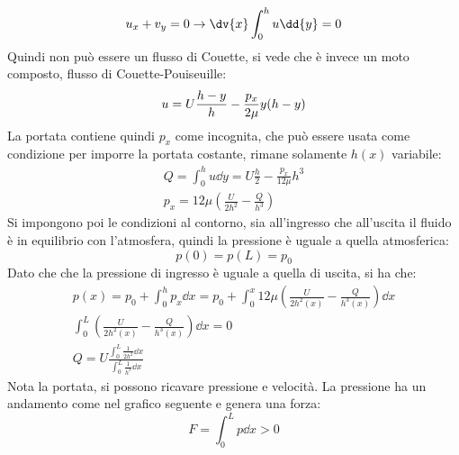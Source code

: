 %
	\begin{equation*}
		u_x + v_y = 0 \rightarrow \dv{x} \int_0^h u \dd{y} = 0
	\end{equation*}
%
Quindi non può essere un flusso di Couette, si vede che è invece un moto composto, flusso di Couette-Pouiseuille:
%
	\begin{equation*}
		u = U \frac{h - y}{h} - \frac{p_x}{2 \mu} y (h - y)\\
	\end{equation*}
%
La portata contiene quindi $p_x$ come incognita, che può essere usata come condizione per imporre la portata costante, rimane solamente $h(x)$ variabile:
%
	\begin{equation*}
		\begin{gathered}
			Q = \int_0^h u \dd{y} = U \frac{h}{2} - \frac{p_x}{12 \mu} h^3\\
			p_x = 12 \mu \left( \frac{U}{2 h^2} - \frac{Q}{h^3} \right)
		\end{gathered}
	\end{equation*}
%
Si impongono poi le condizioni al contorno, sia all'ingresso che all'uscita il fluido è in equilibrio con l'atmosfera, quindi la pressione è uguale a quella atmosferica:
%
	\begin{equation*}
		p(0) = p(L) = p_0
	\end{equation*}
%
Dato che che la pressione di ingresso è uguale a quella di uscita, si ha che:
%
	\begin{equation*}
		\begin{gathered}
			p(x) = p_0 + \int_0^h p_x \dd{x} = p_0 + \int_0^x 12 \mu \left( \frac{U}{2 h^2(x)} - \frac{Q}{h^3(x)} \right) \dd{x}\\
			\int_0^L \left( \frac{U}{2 h^2(x)} - \frac{Q}{h^3(x)} \right) \dd{x} = 0\\
			Q = U \frac{\int_0^L \frac{1}{2 h^2} \dd{x} }{\int_0^L \frac{1}{h^3} \dd{x}}
		\end{gathered}
	\end{equation*}
%
Nota la portata, si possono ricavare pressione e velocità.
La pressione ha un andamento come nel grafico seguente e genera una forza:
%
	\begin{equation*}
		F = \int_0^L p \dd{x} >0
	\end{equation*}
%
%
